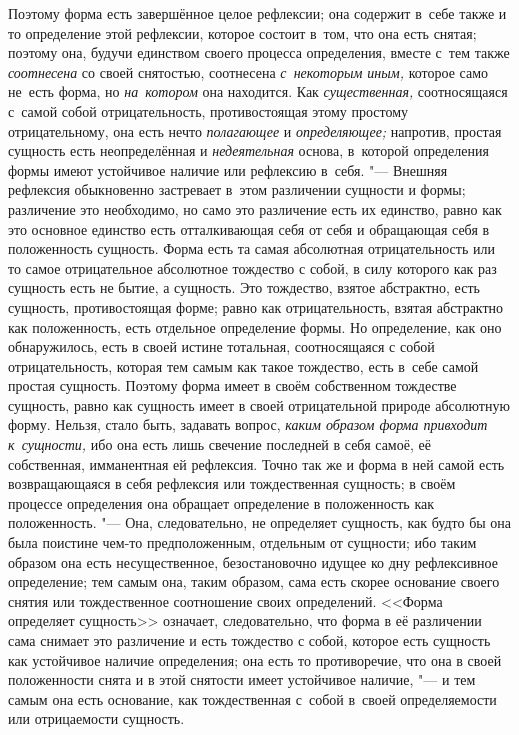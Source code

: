 Поэтому форма есть завершённое целое рефлексии; она содержит в~себе также и то
определение этой рефлексии, которое состоит в~том, что она есть снятая; поэтому
она, будучи единством своего процесса определения, вместе с~тем также
{\em соотнесена} со своей снятостью, соотнесена {\em с~некоторым иным,}
которое само не~есть форма, но {\em на~котором} она находится. Как
{\em существенная,} соотносящаяся с~самой собой отрицательность, противостоящая
этому простому отрицательному, она есть нечто {\em полагающее} и
{\em определяющее;} напротив, простая сущность есть неопределённая и
{\em недеятельная} основа, в~которой определения формы имеют устойчивое наличие
или рефлексию в~себя. "--- Внешняя рефлексия обыкновенно застревает в~этом
различении сущности и формы; различение это необходимо, но само это различение
есть их единство, равно как это основное единство есть отталкивающая себя от
себя и обращающая себя в положенность сущность. Форма есть та самая абсолютная
отрицательность или то самое отрицательное абсолютное тождество с собой, в силу
которого как раз сущность есть не бытие, а сущность. Это тождество, взятое
абстрактно, есть сущность, противостоящая форме; равно как отрицательность,
взятая абстрактно как положенность, есть отдельное определение формы. Но
определение, как оно обнаружилось, есть в своей истине тотальная, соотносящаяся
с собой отрицательность, которая тем самым как такое тождество, есть в~себе
самой простая сущность. Поэтому форма имеет в своём собственном тождестве
сущность, равно как сущность имеет в своей отрицательной природе абсолютную
форму. Нельзя, стало быть, задавать вопрос,
{\em каким образом форма привходит к~сущности,} ибо она есть лишь свечение
последней в себя самоё, её собственная, имманентная ей рефлексия. Точно так же
и форма в ней самой есть возвращающаяся в себя рефлексия или тождественная
сущность; в своём процессе определения она обращает определение в положенность
как положенность. "--- Она, следовательно, не определяет сущность, как будто бы
она была поистине чем-то предположенным, отдельным от сущности; ибо таким
образом она есть несущественное, безостановочно идущее ко дну рефлексивное
определение; тем самым она, таким образом, сама есть скорее основание своего
снятия или тождественное соотношение своих определений. <<Форма определяет
сущность>> означает, следовательно, что форма в её различении сама снимает это
различение и есть тождество с собой, которое есть сущность как устойчивое
наличие определения; она есть то противоречие, что она в своей положенности
снята и в этой снятости имеет устойчивое наличие, "--- и тем самым она есть
основание, как тождественная с~собой в~своей определяемости или отрицаемости
сущность.


